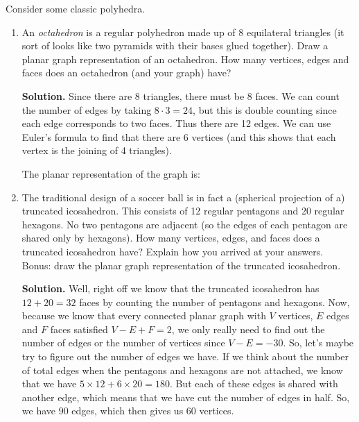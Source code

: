\documentclass{book}
\begin{document}
\setcounter{project}{34}
\addtocounter{project}{-1}
\begin{activity}[]\label{activity-29}
\hypertarget{p-328}{}%
Consider some classic polyhedra.%
\begin{enumerate}[font=\bfseries,label=(\alph*),ref=\alph*]
\item\label{task-44} \hypertarget{p-329}{}%
An \emph{octahedron} is a regular polyhedron made up of 8 equilateral triangles (it sort of looks like two pyramids with their bases glued together). Draw a planar graph representation of an octahedron. How many vertices, edges and faces does an octahedron (and your graph) have?%
\par\smallskip%
\noindent\textbf{Solution.}\hypertarget{solution-29}{}\quad%
\hypertarget{p-330}{}%
Since there are 8 triangles, there must be 8 faces. We can count the number of edges by taking \(8 \cdot 3 = 24\), but this is double counting since each edge corresponds to two faces. Thus there are 12 edges. We can use Euler's formula to find that there are 6 vertices (and this shows that each vertex is the joining of 4 triangles).%
\par
\hypertarget{p-331}{}%
The planar representation of the graph is:%
\item\label{task-45} \hypertarget{p-332}{}%
The traditional design of a soccer ball is in fact a (spherical projection of a) truncated icosahedron. This consists of 12 regular pentagons and 20 regular hexagons. No two pentagons are adjacent (so the edges of each pentagon are shared only by hexagons). How many vertices, edges, and faces does a truncated icosahedron have? Explain how you arrived at your answers. Bonus: draw the planar graph representation of the truncated icosahedron.%
\par\smallskip%
\noindent\textbf{Solution.}\hypertarget{solution-30}{}\quad%
\hypertarget{p-333}{}%
Well, right off we know that the truncated icosahedron has \(12+20=32\) faces by counting the number of pentagons and hexagons. Now, because we know that every connected planar graph with \(V\) vertices, \(E\) edges and \(F\) faces satisfied \(V - E + F = 2\), we only really need to find out the number of edges or the number of vertices since \(V-E=-30\). So, let's maybe try to figure out the number of edges we have. If we think about the number of total edges when the pentagons and hexagons are not attached, we know that we have \(5\times 12+6\times 20=180\). But each of these edges is shared with another edge, which means that we have cut the number of edges in half. So, we have \(90\) edges, which then gives us \(60\) vertices.%

\end{enumerate}
\end{activity}
\end{document}
